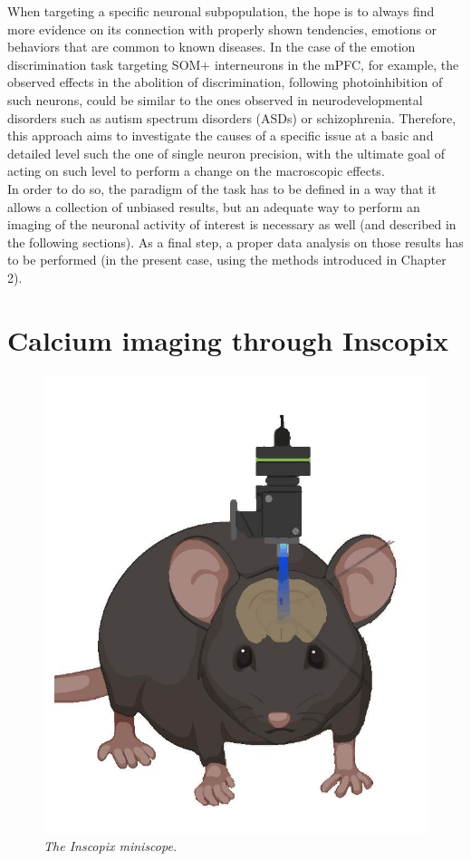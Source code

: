 \documentclass[12pt, a4paper]{report}
\begin{document}
When targeting a specific neuronal subpopulation, the hope is to always find  more evidence on its connection with  properly shown tendencies, emotions or behaviors that are common to known diseases. In the case of the emotion discrimination task targeting SOM+ interneurons in the mPFC, for example, the observed effects in the abolition of discrimination, following photoinhibition of such neurons, could be similar to the ones observed in neurodevelopmental disorders such as autism spectrum disorders (ASDs) or schizophrenia. Therefore, this approach aims to investigate the causes of a specific issue at a basic and detailed level such the one of single neuron precision, with the ultimate goal of acting on such level to perform a change on the macroscopic effects.\\
In order to do so, the paradigm of the task has to be defined in a way that it allows a collection of unbiased results, but an adequate way to perform an imaging of the neuronal activity of interest is necessary as well (and described in the following sections). As a final step, a proper data analysis on those results has to be performed (in the present case, using the methods introduced in Chapter 2).


\section{Calcium imaging through Inscopix} \label{section 1.3}



\begin{figure}[H]
	\begin{center}
		\includegraphics[scale=.35]{Inscopix.jpg} 
	\end{center} 
	\caption{\textit{The Inscopix miniscope.}}
	
\end{figure}
\end{document}
